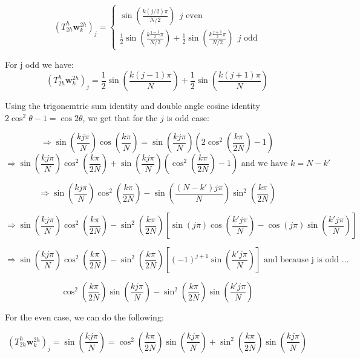 \documentclass[pdftex,12pt,a4paper]{article}
\begin{document}
$$
( T_{2h}^h \mathbf{w}_k^{2h} )_j = 
\begin{cases}
 \sin\left( \frac{ k(j / 2) \pi }{N/2} \right) ~~ j \text{ even}\\
\frac 1 2 \sin \left( \frac{k \frac{j-1}{2} \pi}{N/2} \right) + \frac 1 2 \sin \left( \frac{k \frac{j+1}{2}\pi}{N/2} \right) ~~ j \text{ odd}
\end{cases}
$$

For j odd we have: 
$$
( T_{2h}^h \mathbf{w}_k^{2h} )_j = \frac 1 2 \sin \left( \frac{k (j-1) \pi}{N} \right) + \frac 1 2 \sin \left( \frac{k (j+1)\pi}{N} \right)
$$

Using the trigonemtric sum identity and double angle cosine identity $2 \cos^2 \theta -1 = \cos 2 \theta $, we get that for the $j$ is odd case: 

$$ \Rightarrow
\sin \left( \frac{kj \pi}{N}\right) \cos \left( \frac{k \pi}{N}\right) = \sin \left( \frac{kj \pi}{N}\right)  \left(2 \cos^2 \left( \frac{k \pi}{2N} \right)  - 1  \right) 
$$
$$ \Rightarrow
\sin \left( \frac{kj \pi}{N}\right) \cos^2 \left( \frac{k \pi}{2N} \right) + \sin \left( \frac{kj \pi}{N}\right) \left( \cos^2 \left( \frac{k \pi}{2N} \right) - 1\right) \text{ and we have } k = N - k'$$ 

$$ \Rightarrow 
\sin \left( \frac{kj \pi}{N}\right) \cos^2 \left( \frac{k \pi}{2N} \right) - \sin \left( \frac{(N-k')j \pi}{N}\right) \sin^2 \left( \frac{k \pi}{2N} \right)
$$

$$ \Rightarrow
\sin \left( \frac{kj \pi}{N}\right) \cos^2 \left( \frac{k \pi}{2N} \right)  - \sin^2 \left( \frac{k \pi}{2N} \right) \left[ \sin(j \pi) \cos \left( \frac{k' j \pi}{N}\right) - \cos( j \pi) \sin \left( \frac{k' j \pi}{N}\right)\right]
$$

$$\Rightarrow
\sin \left( \frac{kj \pi}{N}\right) \cos^2 \left( \frac{k \pi}{2N} \right)  -\sin^2 \left( \frac{k \pi}{2N} \right)  \left[ (-1)^{j+1} \sin \left( \frac{k' j \pi}{N}\right) \right] \text{ and because j is odd ... }
$$

\begin{equation}
\cos^2 \left( \frac{k \pi}{2N} \right) \sin \left( \frac{kj \pi}{N}\right)  -\sin^2 \left( \frac{k \pi}{2N} \right) \sin \left( \frac{k' j \pi}{N}\right)
\end{equation}

For the even case, we can do the following: 

$$
( T_{2h}^h \mathbf{w}_k^{2h} )_j = \sin\left( \frac{ k j \pi }{N} \right) = \cos^2 \left( \frac{k \pi}{2N} \right) \sin\left( \frac{ k j \pi }{N} \right) + \sin^2 \left( \frac{k \pi}{2N} \right) \sin\left( \frac{ k j \pi }{N} \right)
$$
\end{document}
